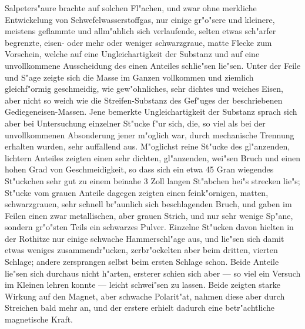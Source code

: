 \documentclass[a4paper, 11pt, oneside, german]{article}
\begin{document}
{{\hspace*{6mm}Salpeters"aure brachte auf solchen Fl"achen, und zwar ohne merkliche Entwickelung von Schwefelwasserstoffgas, nur einige gr"o"sere und kleinere, meistens geflammte und allm"ahlich sich verlaufende, selten etwas sch"arfer begrenzte, eisen- oder mehr oder weniger schwarzgraue, matte Flecke zum Vorschein, welche auf eine Ungleichartigkeit der Substanz und auf eine unvollkommene Ausscheidung des einen Anteiles schlie"sen lie"sen. Unter der Feile und S"age zeigte sich die Masse im Ganzen vollkommen und ziemlich gleichf"ormig geschmeidig, wie gew"ohnliches, sehr dichtes und weiches Eisen, aber nicht so weich wie die Streifen-Substanz des Gef"uges der beschriebenen Gediegeneisen-Massen. Jene bemerkte Ungleichartigkeit der Substanz sprach sich aber bei Untersuchung einzelner St"ucke f"ur sich, die, so viel als bei der unvollkommenen Absonderung jener m"oglich war, durch mechanische Trennung erhalten wurden, sehr auffallend aus. M"oglichst reine St"ucke des gl"anzenden, lichtern Anteiles zeigten einen sehr dichten, gl"anzenden, wei"sen Bruch und einen hohen Grad von Geschmeidigkeit, so dass sich ein etwa 45 Gran wiegendes St"uckchen sehr gut zu einem beinahe 3 Zoll langen St"abchen hei"s strecken lie"s; St"ucke vom grauen Anteile dagegen zeigten einen feink"ornigen, matten, schwarzgrauen, sehr schnell br"aunlich sich beschlagenden Bruch, und gaben im Feilen einen zwar metallischen, aber grauen Strich, und nur sehr wenige Sp"ane, sondern gr"o"sten Teils ein schwarzes Pulver. Einzelne St"ucken davon hielten in der Rothitze nur einige schwache Hammerschl"age aus, und lie"sen sich damit etwas weniges zusammendr"ucken, zerbr"ockelten aber beim dritten, vierten Schlage; andere zersprangen selbst beim ersten Schlage schon. Beide Anteile lie"sen sich durchaus nicht h"arten, ersterer schien sich aber --- so viel ein Versuch im Kleinen lehren konnte --- leicht schwei"sen zu lassen. Beide zeigten starke Wirkung auf den Magnet, aber schwache Polarit"at, nahmen diese aber durch Streichen bald mehr an, und der erstere erhielt dadurch eine betr"achtliche magnetische Kraft.\\
}}
\end{document}
